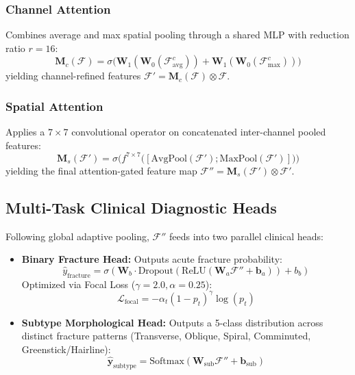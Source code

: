 \documentclass[3p,twocolumn]{elsarticle}
\begin{document}
\subsubsection{Channel Attention}
Combines average and max spatial pooling through a shared MLP with reduction ratio $r=16$:
\begin{equation}
    \mathbf{M}_c(\mathcal{F}) = \sigma\Big(\mathbf{W}_1(\mathbf{W}_0(\mathcal{F}_{\text{avg}}^c)) + \mathbf{W}_1(\mathbf{W}_0(\mathcal{F}_{\text{max}}^c))\Big)
\end{equation}
yielding channel-refined features $\mathcal{F}' = \mathbf{M}_c(\mathcal{F}) \otimes \mathcal{F}$.

\subsubsection{Spatial Attention}
Applies a $7 \times 7$ convolutional operator on concatenated inter-channel pooled features:
\begin{equation}
    \mathbf{M}_s(\mathcal{F}') = \sigma\Big(f^{7 \times 7}\big([\text{AvgPool}(\mathcal{F}'); \text{MaxPool}(\mathcal{F}')]\big)\Big)
\end{equation}
yielding the final attention-gated feature map $\mathcal{F}'' = \mathbf{M}_s(\mathcal{F}') \otimes \mathcal{F}'$.

\subsection{Multi-Task Clinical Diagnostic Heads}
Following global adaptive pooling, $\mathcal{F}''$ feeds into two parallel clinical heads:
\begin{itemize}
    \item \textbf{Binary Fracture Head:} Outputs acute fracture probability:
    \begin{equation}
        \hat{y}_{\text{fracture}} = \sigma\left(\mathbf{W}_b \cdot \text{Dropout}(\text{ReLU}(\mathbf{W}_a \mathcal{F}'' + \mathbf{b}_a)) + b_b\right)
    \end{equation}
    Optimized via Focal Loss ($\gamma = 2.0, \alpha = 0.25$):
    \begin{equation}
        \mathcal{L}_{\text{focal}} = -\alpha_t (1 - p_t)^\gamma \log(p_t)
    \end{equation}
    \item \textbf{Subtype Morphological Head:} Outputs a 5-class distribution across distinct fracture patterns (Transverse, Oblique, Spiral, Comminuted, Greenstick/Hairline):
    \begin{equation}
        \hat{\mathbf{y}}_{\text{subtype}} = \text{Softmax}\left(\mathbf{W}_{\text{sub}} \mathcal{F}'' + \mathbf{b}_{\text{sub}}\right)
    \end{equation}
\end{itemize}
\end{document}
